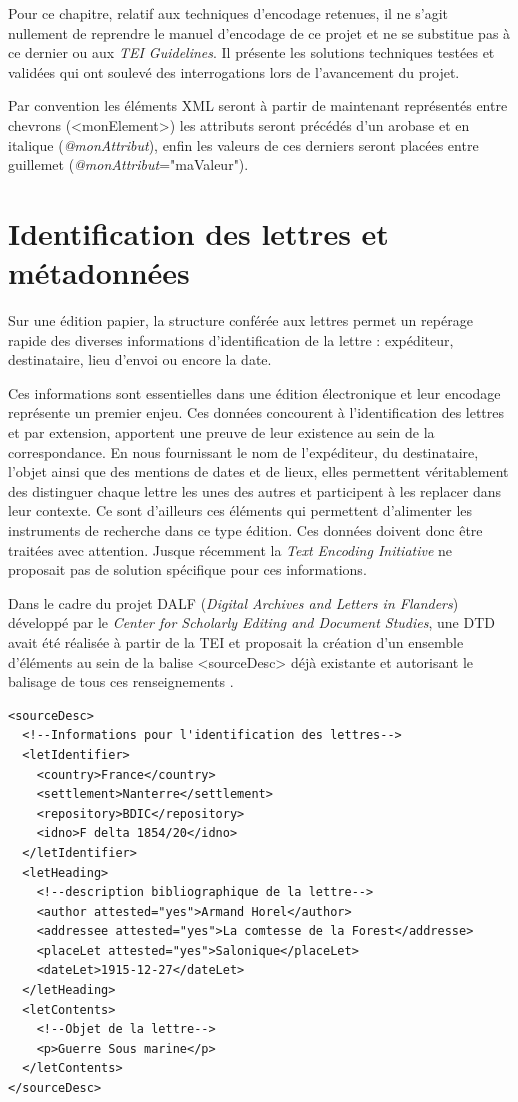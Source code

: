 \documentclass[12pt,a4paper]{book} %
\begin{document}
Pour ce chapitre, relatif aux techniques d'encodage retenues, il ne s'agit nullement de reprendre le manuel d'encodage de ce projet et ne se substitue pas à ce dernier ou aux \textit{TEI Guidelines}. Il présente les solutions techniques testées et validées qui ont soulevé des interrogations lors de l'avancement du projet. 

Par convention les éléments XML seront à partir de maintenant représentés entre chevrons (<monElement>) les attributs seront précédés d'un arobase et en italique (\textit{@monAttribut}), enfin les valeurs de ces derniers seront placées entre guillemet (\textit{@monAttribut}="maValeur").


\section{Identification des lettres et métadonnées}
Sur une édition papier, la structure conférée aux lettres permet un repérage rapide des diverses informations d'identification de la lettre : expéditeur, destinataire, lieu d'envoi ou encore la date.

Ces informations sont essentielles dans une édition électronique et leur encodage représente un premier enjeu. Ces données concourent à l'identification des lettres et par extension, apportent une preuve de leur existence au sein de la correspondance. En nous fournissant le nom de l'expéditeur, du destinataire, l'objet ainsi que des mentions de dates et de lieux, elles permettent véritablement des distinguer chaque lettre les unes des autres et participent à les replacer dans leur contexte. Ce sont d'ailleurs ces éléments qui permettent d'alimenter les instruments de recherche dans ce type édition. Ces données doivent donc être traitées avec attention. 
Jusque récemment la \textit{Text Encoding Initiative} ne proposait pas de solution spécifique pour ces informations.

Dans le cadre du projet DALF (\textit{Digital Archives and Letters in Flanders}) développé par le \textit{Center for Scholarly Editing and Document Studies}, une DTD avait été réalisée à partir de la TEI et proposait la création d'un ensemble d'éléments au sein de la balise <sourceDesc> déjà existante et autorisant le balisage de tous ces renseignements .
\bigskip

\begin{lstlisting}
<sourceDesc>
  <!--Informations pour l'identification des lettres-->
  <letIdentifier>
    <country>France</country>
    <settlement>Nanterre</settlement>
    <repository>BDIC</repository>
    <idno>F delta 1854/20</idno>
  </letIdentifier>
  <letHeading>
    <!--description bibliographique de la lettre-->
    <author attested="yes">Armand Horel</author>
    <addressee attested="yes">La comtesse de la Forest</addresse>
    <placeLet attested="yes">Salonique</placeLet>
    <dateLet>1915-12-27</dateLet>  
  </letHeading>
  <letContents>
    <!--Objet de la lettre-->
    <p>Guerre Sous marine</p>  
  </letContents>
</sourceDesc>
\end{lstlisting}
\bigskip
\end{document}
